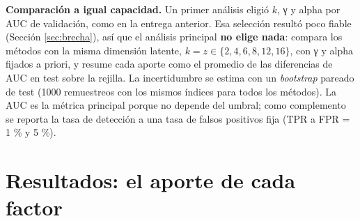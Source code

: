 \documentclass[
  11pt,
]{article}
\begin{document}
\textbf{Comparación a igual capacidad.} Un primer análisis eligió \(k\), γ y alpha por AUC de validación,
como en la entrega anterior. Esa selección resultó poco fiable (Sección \ref{sec:brecha}), así que el
análisis principal \textbf{no elige nada}: compara los métodos con la misma dimensión latente,
\(k = z \in \{2, 4, 6, 8, 12, 16\}\), con γ y alpha fijados a priori, y resume cada aporte como el
promedio de las diferencias de AUC en test sobre la rejilla. La incertidumbre se estima con un
\emph{bootstrap} pareado de test (1000 remuestreos con los mismos índices para todos los métodos). La AUC es
la métrica principal porque no depende del umbral; como complemento se reporta la tasa de detección a
una tasa de falsos positivos fija (TPR a FPR = 1 \% y 5 \%).

\hypertarget{sec:aportes}{%
\section{Resultados: el aporte de cada factor}\label{sec:aportes}}

\begin{table}[!h]
\centering
\caption{\label{tab:tabla-aportes}Aportes a igual capacidad: diferencia promedio sobre k = 2 a 16 en test, con IC del 95 \% por bootstrap pareado.}
\centering
{}
\end{table}
\end{document}

